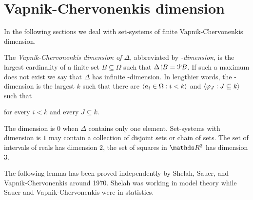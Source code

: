 \documentclass[creche.tex]{subfiles}
\begin{document}
% 
% 



\section{Vapnik-Chervonenkis dimension}\label{vc_dimension}


In the following sections we deal with set-systems of finite Vapnik-Cher\-vo\-nen\-kis dimension.


\begin{definition}\label{def_VCdim}
The \emph{Vapnik-Cher\-vo\-nen\-kis dimension of $\Delta$}, abbreviated by \emph{\vc-dimension}, is the largest cardinality of a finite set $B\subseteq\Omega$ such that $\Delta\mathord\restriction B=\P B$. If such a maximum does not exist we say that $\Delta$ has infinite \vc-dimension. In lengthier words, the \vc-dimension is the largest $k$ such that there are $\<a_i\in\Omega :i<k\>$ and $\<\phi_J:J\subseteq k\>$ such that


\qquad  for every $i<k$ and every $J\subseteq k$.
\end{definition}


The dimension is $0$ when $\Delta$ contains only one element. Set-systems with dimension is $1$ may contain a collection of disjoint sets or chain of sets. The set of intervals of reals has dimension $2$, the set of squares in $\RR^2$ has dimension $3$.

The following lemma has been proved independently by Shelah, Sauer, and Vapnik-Cher\-vo\-nen\-kis around 1970. Shelah was working in model theory while Sauer and Vapnik-Chervonenkis were in statistics. 
\end{document}
